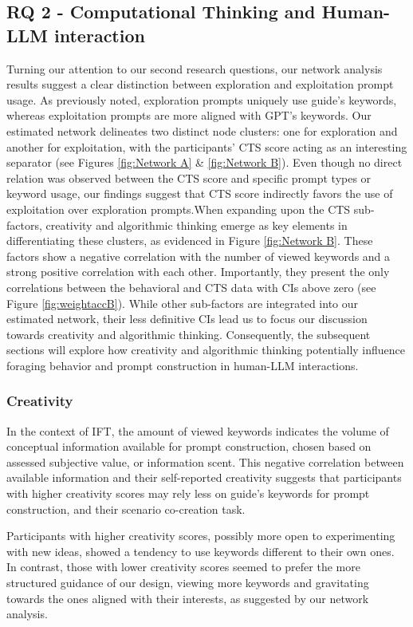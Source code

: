 \documentclass[sn-mathphys, Numbered]{sn-jnl}%
\theoremstyle{thmstyleone}%
\theoremstyle{thmstyletwo}%
\theoremstyle{thmstylethree}%
\begin{document}
\subsection*{RQ 2 - Computational Thinking and Human-LLM interaction}

Turning our attention to our second research questions, our network analysis results suggest a clear distinction between exploration and exploitation prompt usage. As previously noted, exploration prompts uniquely use guide's keywords, whereas exploitation prompts are more aligned with GPT's keywords. Our estimated network delineates two distinct node clusters: one for exploration and another for exploitation, with the participants' CTS score acting as an interesting separator (see Figures \ref{fig:Network A} \& \ref{fig:Network B}). Even though no direct relation was observed between the CTS score and specific prompt types or keyword usage, our findings suggest that CTS score indirectly favors the use of exploitation over exploration prompts.When expanding upon the CTS sub-factors, creativity and algorithmic thinking emerge as key elements in differentiating these clusters, as evidenced in Figure \ref{fig:Network B}.
These factors show a negative correlation with the number of viewed keywords and a strong positive correlation with each other. Importantly, they present the only correlations between the behavioral and CTS data with CIs above zero (see Figure \ref{fig:weightaccB}). 
While other sub-factors are integrated into our estimated network, their less definitive CIs lead us to focus our discussion towards creativity and algorithmic thinking. Consequently, the subsequent sections will explore how creativity and algorithmic thinking potentially influence foraging behavior and prompt construction in human-LLM interactions.

\subsubsection*{Creativity}

In the context of IFT, the amount of viewed keywords indicates the volume of conceptual information available for prompt construction, chosen based on assessed subjective value, or information scent. This negative correlation between available information and their self-reported creativity suggests that participants with higher creativity scores may rely less on guide's keywords for prompt construction, and  their scenario co-creation task.

Participants with higher creativity scores, possibly more open to experimenting with new ideas, showed a tendency to use keywords different to their own ones. In contrast, those with lower creativity scores seemed to prefer the more structured guidance of our design, viewing more keywords and gravitating towards the ones aligned with their interests, as suggested by our network analysis.  
\end{document}
